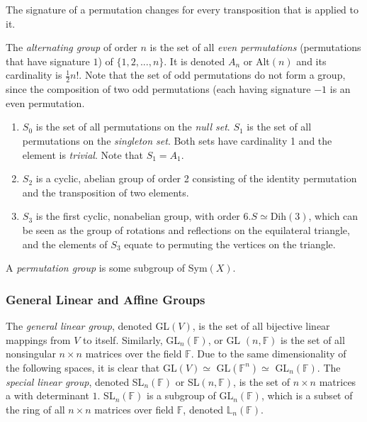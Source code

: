 \documentclass{article}
\begin{document}
\begin{proposition}
  The signature of a permutation changes for every transposition that is applied to it. 
\end{proposition}

\begin{definition}
  The \textit{alternating group} of order $n$ is the set of all \textit{even permutations} (permutations that have signature $1$) of $\{1, 2, ..., n\}$. It is denoted $A_{n}$ or Alt$(n)$ and its cardinality is $\frac{1}{2} n!$. Note that the set of odd permutations do not form a group, since the composition of two odd permutations (each having signature $-1$ is an even permutation. 
\end{definition}

\begin{example}
\begin{enumerate}
  \item $S_{0}$ is the set of all permutations on the \textit{null set}. $S_{1}$ is the set of all permutations on the \textit{singleton set}. Both sets have cardinality 1 and the element is \textit{trivial}. Note that $S_{1} = A_{1}$. 
  \item $S_{2}$ is a cyclic, abelian group of order 2 consisting of the identity permutation and the transposition of two elements. 
  \item $S_{3}$ is the first cyclic, nonabelian group, with order 6.$S \simeq \text{Dih}(3)$, which can be seen as the group of rotations and reflections on the equilateral triangle, and the elements of $S_{3}$ equate to permuting the vertices on the triangle. 
\end{enumerate}
\end{example}

\begin{definition}
  A \textit{permutation group} is some subgroup of Sym$(X)$. 
\end{definition}

\subsubsection{General Linear and Affine Groups}

\begin{definition}
  The \textit{general linear group}, denoted GL$(V)$, is the set of all bijective linear mappings from $V$ to itself. Similarly, GL$_{n}(\mathbb{F})$, or GL $(n, \mathbb{F})$ is the set of all nonsingular $n \times n$ matrices over the field $\mathbb{F}$. Due to the same dimensionality of the following spaces, it is clear that GL$(V) \simeq$ GL$(\mathbb{F}^{n}) \simeq$ GL$_{n}(\mathbb{F})$. The \textit{special linear group}, denoted SL$_{n} (\mathbb{F})$ or SL$(n, \mathbb{F})$, is the set of $n\times n$ matrices a with determinant $1$. SL$_{n}(\mathbb{F})$ is a subgroup of GL$_{n}(\mathbb{F})$, which is a subset of the ring of all $n \times n$ matrices over field $\mathbb{F}$, denoted $\mathbb{L}_{n}(\mathbb{F})$. 
\end{definition}
\end{document}
